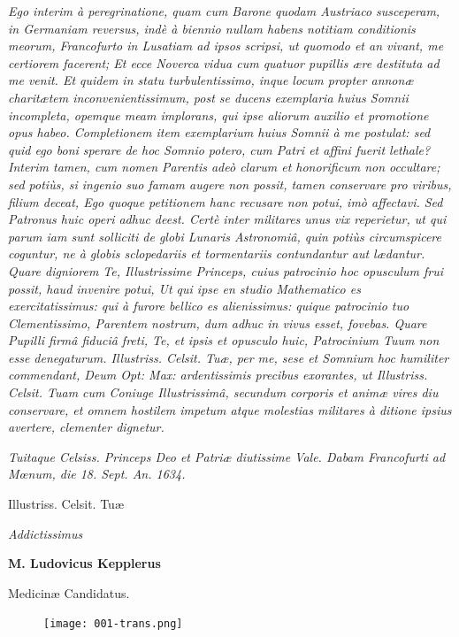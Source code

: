 \documentclass[a4paper, 11pt, oneside, polutonikogreek, german]{article}
\begin{document}
\emph{Ego interim à peregrinatione, quam cum Barone quodam Austriaco susceperam, in Germaniam reversus, indè à biennio nullam habens notitiam conditionis meorum, Francofurto in Lusatiam ad ipsos scripsi, ut quomodo et an vivant, me certiorem facerent; Et ecce Noverca vidua cum quatuor pupillis ære destituta ad me venit. Et quidem in statu turbulentissimo, inque locum propter annonæ charitætem inconvenientissimum, post se ducens exemplaria huius Somnii incompleta, opemque meam implorans, qui ipse aliorum auxilio et promotione opus habeo. Completionem item exemplarium huius Somnii à me postulat: sed quid ego boni sperare de hoc Somnio potero, cum Patri et affini fuerit lethale? Interim tamen, cum nomen Parentis adeò clarum et honorificum non occultare; sed potiùs, si ingenio suo famam augere non possit, tamen conservare pro viribus, filium deceat, Ego quoque petitionem hanc recusare non potui, imò affectavi. Sed Patronus huic operi adhuc deest. Certè inter militares unus vix reperietur, ut qui parum iam sunt solliciti de globi Lunaris Astronomiâ, quin potiùs circumspicere coguntur, ne à globis sclopedariis et tormentariis contundantur aut lædantur. Quare digniorem Te, Illustrissime Princeps, cuius patrocinio hoc opusculum frui possit, haud invenire potui, Ut qui ipse en studio Mathematico es exercitatissimus: qui à furore bellico es alienissimus: quique patrocinio tuo Clementissimo, Parentem nostrum, dum adhuc in vivus esset, fovebas. Quare Pupilli firmâ fiduciâ freti, Te, et ipsis et opusculo huic, Patrocinium Tuum non esse denegaturum. Illustriss. Celsit. Tuæ, per me, sese et Somnium hoc humiliter commendant, Deum Opt: Max: ardentissimis precibus exorantes, ut Illustriss. Celsit. Tuam cum Coniuge Illustrissimâ, secundum corporis et animæ vires diu conservare, et omnem hostilem impetum atque molestias militares à ditione ipsius avertere, clementer dignetur.}

\bigskip

\emph{Tuitaque Celsiss. Princeps Deo et Patriæ diutissime Vale. Dabam Francofurti ad Mœnum, die 18. Sept. An. 1634.}

\begin{center}
Illustriss. Celsit. Tuæ

\emph{Addictissimus}

\textbf{M. Ludovicus Kepplerus}

Medicinæ Candidatus.
\end{center}
\clearpage
\begin{figure}[H]
\centering
\texttt{[image: 001-trans.png]}
\end{figure}
\end{document}
